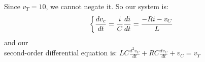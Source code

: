 \documentclass[preview]{standalone}
\begin{document}
\begin{center}
\raggedright
                    Since $v_T = 10$, we cannot negate it. So our system is:
                    \[
                    \left\{
                        \frac{dv_c}{dt} = \frac{i}{C} \\
                        \frac{di}{dt} = \frac{-Ri - v_C}{L}
                    \right.
                    \] and our \\
                    second-order differential equation is: 
                        $ LC\frac{d^2v_C}{dt} + RC\frac{dv_C}{dt} + v_C = v_T $
\end{center}
\end{document}
